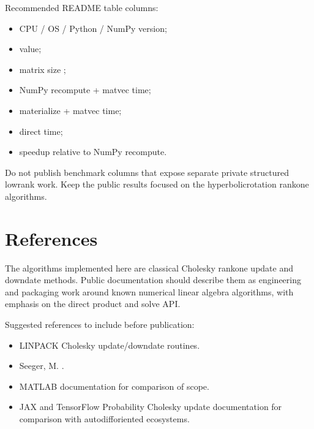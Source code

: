 \documentclass[a4paper,11pt,english]{sphinxmanual}
\begin{document}
\sphinxAtStartPar
Recommended README table columns:
\begin{itemize}
\item {} 
\sphinxAtStartPar
CPU / OS / Python / NumPy version;

\item {} 
\sphinxAtStartPar
{} value;

\item {} 
\sphinxAtStartPar
matrix size ;

\item {} 
\sphinxAtStartPar
NumPy recompute + matvec time;

\item {} 
\sphinxAtStartPar
{} materialize + matvec time;

\item {} 
\sphinxAtStartPar
{} direct  time;

\item {} 
\sphinxAtStartPar
speedup relative to NumPy recompute.

\end{itemize}

\sphinxAtStartPar
Do not publish benchmark columns that expose separate private structured
low\sphinxhyphen{}rank work.  Keep the public results focused on the hyperbolic\sphinxhyphen{}rotation
rank\sphinxhyphen{}one algorithms.

\sphinxstepscope


\chapter{References}
\label{\detokenize{references:references}}\label{\detokenize{references::doc}}
\sphinxAtStartPar
The algorithms implemented here are classical Cholesky rank\sphinxhyphen{}one update and
downdate methods.  Public documentation should describe them as engineering and
packaging work around known numerical linear algebra algorithms, with emphasis
on the direct product and solve API.

\sphinxAtStartPar
Suggested references to include before publication:
\begin{itemize}
\item {} 
\sphinxAtStartPar
LINPACK Cholesky update/downdate routines.

\item {} 
\sphinxAtStartPar
Seeger, M. .

\item {} 
\sphinxAtStartPar
MATLAB  documentation for comparison of scope.

\item {} 
\sphinxAtStartPar
JAX and TensorFlow Probability Cholesky update documentation for comparison
with autodiff\sphinxhyphen{}oriented ecosystems.

\end{itemize}
\end{document}
